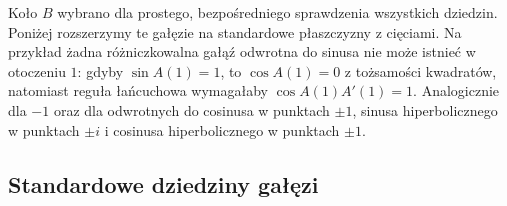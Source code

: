 \begin{uwaga}
Koło $B$ wybrano dla prostego, bezpośredniego
sprawdzenia wszystkich dziedzin. Poniżej rozszerzymy
te gałęzie na standardowe płaszczyzny z cięciami.
Na przykład żadna różniczkowalna gałąź odwrotna
do sinusa nie może istnieć w otoczeniu $1$:
gdyby $\sin A(1)=1$, to $\cos A(1)=0$ z tożsamości
kwadratów, natomiast reguła łańcuchowa wymagałaby
$\cos A(1)A'(1)=1$. Analogicznie dla $-1$
oraz dla odwrotnych do cosinusa w punktach $\pm1$,
sinusa hiperbolicznego w punktach $\pm i$ i cosinusa
hiperbolicznego w punktach $\pm1$.
\end{uwaga}

\subsection{Standardowe dziedziny gałęzi}

